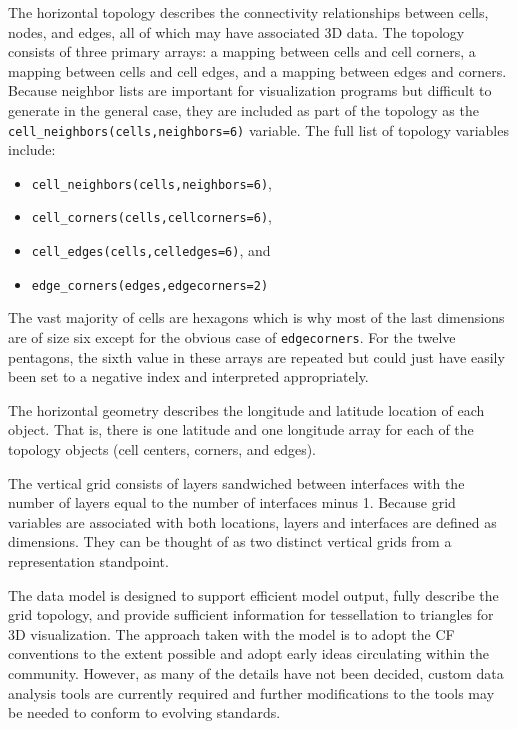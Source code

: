 The horizontal topology describes the connectivity relationships between
cells, nodes, and edges, all of which may have associated 3D data.  The
topology consists of three primary arrays: a mapping between cells and cell
corners, a mapping between cells and cell edges, and a mapping between edges
and corners.  Because neighbor lists are important for visualization programs
but difficult to generate in the general case, they are included as part of
the topology as the \verb+cell_neighbors(cells,neighbors=6)+ variable.  The
full list of topology variables include:

\begin{itemize}
\item \verb+cell_neighbors(cells,neighbors=6)+,
\item \verb+cell_corners(cells,cellcorners=6)+,
\item \verb+cell_edges(cells,celledges=6)+, and
\item \verb+edge_corners(edges,edgecorners=2)+
\end{itemize}

The vast majority of cells are hexagons which is why most of the last
dimensions are of size six except for the obvious case of \verb+edgecorners+.
For the twelve pentagons, the sixth value in these arrays are repeated but
could just have easily been set to a negative index and interpreted
appropriately.

The horizontal geometry describes the longitude and latitude location of each
object.  That is, there is one latitude and one longitude array for each of
the topology objects (cell centers, corners, and edges).

The vertical grid consists of layers sandwiched between interfaces with the
number of layers equal to the number of interfaces minus 1.   Because grid
variables are associated with both locations, layers and interfaces are
defined as dimensions.  They can be thought of as two distinct vertical grids
from a representation standpoint.

The data model is designed to support efficient model output, fully describe
the grid topology, and provide sufficient information for tessellation to
triangles for 3D visualization.  The approach taken with the model is to adopt
the CF conventions to the extent possible and adopt early ideas circulating
within the community.  However, as many of the details have not been decided,
custom data analysis tools are currently required and further modifications to
the tools may be needed to conform to evolving standards.

